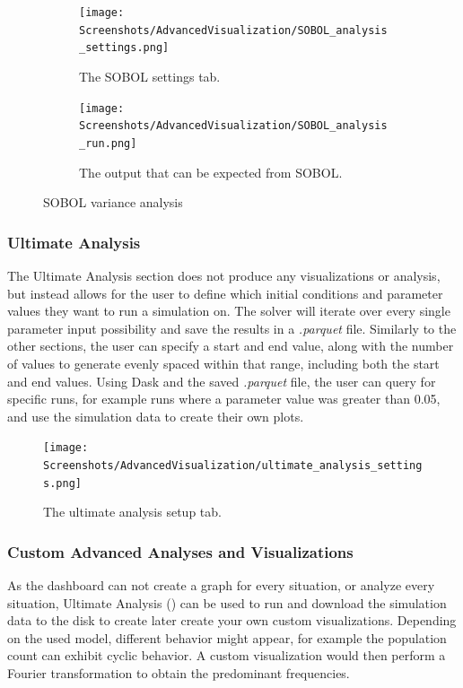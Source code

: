 \begin{figure}[h!]
    \centering
    \begin{subfigure}{0.49\linewidth}
        \centering
        \vspace*{\fill}
        \texttt{[image: Screenshots/AdvancedVisualization/SOBOL\_analysis\_settings.png]}
        \caption{
            The SOBOL settings tab. 
        }
        \label{fig:ss:av:SOBOL_analysis_settings}
        \vspace*{\fill}
    \end{subfigure}
    \hfill
    \begin{subfigure}{0.49\linewidth}
        \centering
        \vspace*{\fill}
        \texttt{[image: Screenshots/AdvancedVisualization/SOBOL\_analysis\_run.png]}
        \caption{
            The output that can be expected from SOBOL. 
        }
        \label{fig:ss:av:SOBOL_analysis_run}
        \vspace*{\fill}
    \end{subfigure}
    \caption{SOBOL variance analysis}
\end{figure}

\subsubsection{Ultimate Analysis}
\label{sec:ultimate_analysis}
The Ultimate Analysis section does not produce any visualizations or analysis, but instead allows for the user to define which initial conditions and parameter values they want to run a simulation on.
The solver will iterate over every single parameter input possibility and save the results in a \textit{.parquet} file.
Similarly to the other sections, the user can specify a start and end value, along with the number of values to generate evenly spaced within that range, including both the start and end values.
\newline
Using Dask and the saved \textit{.parquet} file, the user can query for specific runs, for example runs where a parameter value was greater than 0.05, and use the simulation data to create their own plots.
\begin{figure}
    \centering
    \texttt{[image: Screenshots/AdvancedVisualization/ultimate\_analysis\_settings.png]}
    \caption{
        The ultimate analysis setup tab. 
    }
    \label{fig:ss:av:ultimate_analysis_settings}
\end{figure}


\subsubsection{Custom Advanced Analyses and Visualizations}
\label{sec:custom_analysis}
As the dashboard can not create a graph for every situation, or analyze every situation, Ultimate Analysis () can be used to run and download the simulation data to the disk to create later create your own custom visualizations. 
Depending on the used model, different behavior might appear, for example the population count can exhibit cyclic behavior. 
A custom visualization would then perform a Fourier transformation to obtain the predominant frequencies. 

